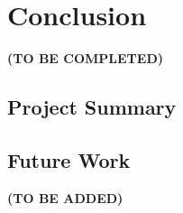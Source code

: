 \documentclass{l4proj}
\begin{document}
\chapter{Conclusion}    
\textbf{(TO BE COMPLETED)}
\section{Project Summary}
\section{Future Work}
\begin{appendices}
\textbf{(TO BE ADDED)}
\end{appendices}



\end{document}
